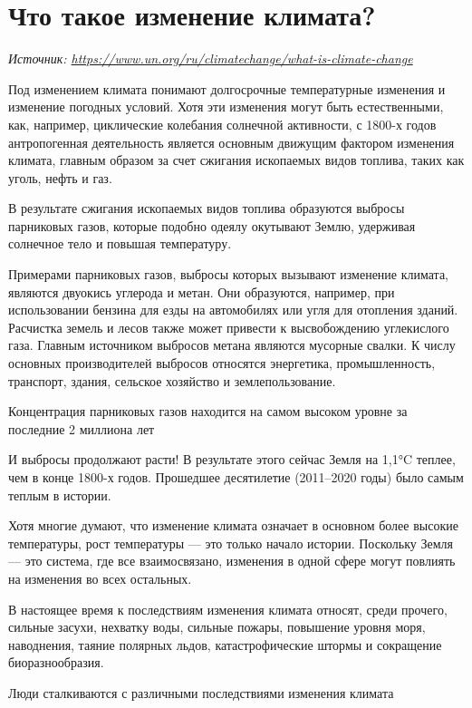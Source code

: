 \section{Что такое изменение климата?}
\textit{Источник: \url{https://www.un.org/ru/climatechange/what-is-climate-change}}

Под изменением климата понимают долгосрочные температурные изменения и изменение погодных условий. Хотя эти изменения могут быть естественными, как, например, циклические колебания солнечной активности, с 1800-х годов антропогенная деятельность является основным движущим фактором изменения климата, главным образом за счет сжигания ископаемых видов топлива, таких как уголь, нефть и газ.

В результате сжигания ископаемых видов топлива образуются выбросы парниковых газов, которые подобно одеялу окутывают Землю, удерживая солнечное тело и повышая температуру.

Примерами парниковых газов, выбросы которых вызывают изменение климата, являются двуокись углерода и метан. Они образуются, например, при использовании бензина для езды на автомобилях или угля для отопления зданий. Расчистка земель и лесов также может привести к высвобождению углекислого газа. Главным источником выбросов метана являются мусорные свалки. К числу основных производителей выбросов относятся энергетика, промышленность, транспорт, здания, сельское хозяйство и землепользование.

\begin{fancyquotes}
    Концентрация парниковых газов находится на самом высоком уровне за последние 2 миллиона лет
\end{fancyquotes}

И выбросы продолжают расти! В результате этого сейчас Земля на 1,1°C теплее, чем в конце 1800-х годов. Прошедшее десятилетие (2011–2020 годы) было самым теплым в истории.

Хотя многие думают, что изменение климата означает в основном более высокие температуры, рост температуры — это только начало истории. Поскольку Земля — это система, где все взаимосвязано, изменения в одной сфере могут повлиять на изменения во всех остальных.

В настоящее время к последствиям изменения климата относят, среди прочего, сильные засухи, нехватку воды, сильные пожары, повышение уровня моря, наводнения, таяние полярных льдов, катастрофические штормы и сокращение биоразнообразия.

\begin{fancyquotes}
    Люди сталкиваются с различными последствиями изменения климата
\end{fancyquotes}

